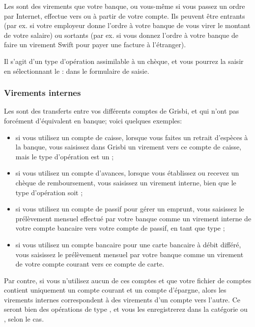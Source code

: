Les  sont des virements que votre banque, ou vous-même si vous passez un ordre par Internet, effectue vers ou à partir de votre compte. Ils peuvent être entrants (par ex. si votre employeur donne l'ordre à votre banque de vous virer le montant de votre salaire) ou sortants (par ex. si vous donnez l'ordre à votre banque de faire un virement Swift pour payer une facture à l'étranger).

Il s'agit d'un type d'opération assimilable à un chèque, et vous pourrez la saisir en sélectionnant le :  dans le formulaire de saisie.


\subsubsection{Virements internes\label{transactions-new-transfer-internal}}

Les  sont des transferts entre vos différents comptes de Grisbi, et qui n'ont pas forcément d'équivalent en banque; voici quelques exemples:

\begin{itemize}
	\item si vous utilisez un compte de caisse, lorsque vous faites un retrait d'espèces à la banque, vous saisissez dans Grisbi un virement vers ce compte de caisse, mais le type d'opération est un ;
	\item si vous utilisez un compte d'avances, lorsque vous établissez ou recevez un chèque de remboursement, vous saisissez un virement interne, bien que le type d'opération soit ;
	\item si vous utilisez un compte de passif pour gérer un emprunt, vous saisissez le prélèvement mensuel effectué par votre banque comme un virement interne de votre compte bancaire vers votre compte de passif, en tant que type ;
	\item si vous utilisez un compte bancaire pour une carte bancaire à débit différé, vous saisissez le prélèvement mensuel par votre banque comme un virement de votre compte courant vers ce compte de carte.
\end{itemize}

Par contre, si vous n'utilisez aucun de ces comptes et que votre fichier de comptes contient uniquement un compte courant et un compte d'épargne, alors les virements internes correspondent à des virements d'un compte vers l'autre. Ce seront bien des opérations de type , et vous les enregistrerez dans la catégorie  ou , selon le cas.

